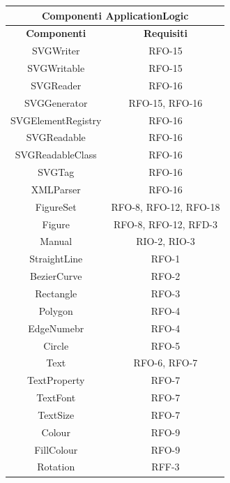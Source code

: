 \begin{table}[h]
\begin{center}
     \begin{tabular}
           {@{\extracolsep{\fill}}|c|c|}
      		\hline
           \multicolumn{2}{|c|}{ \textbf{Componenti ApplicationLogic} } \\
     \hline
      \textbf{Componenti} & \textbf{Requisiti} \\
      \hline
     SVGWriter & RFO-15 \\
     \hline
     SVGWritable & RFO-15\\
     \hline
     SVGReader & RFO-16\\
     \hline
     SVGGenerator & RFO-15, RFO-16\\
     \hline
     SVGElementRegistry & RFO-16\\
     \hline
     SVGReadable & RFO-16\\
     \hline
     SVGReadableClass & RFO-16\\
     \hline
     SVGTag & RFO-16\\
     \hline
     XMLParser & RFO-16\\
     \hline
     FigureSet & RFO-8, RFO-12, RFO-18 \\
     \hline
     Figure & RFO-8, RFO-12, RFD-3 \\
     \hline
     Manual & RIO-2, RIO-3 \\
     \hline
     StraightLine & RFO-1 \\
     \hline
     BezierCurve & RFO-2 \\
     \hline
     Rectangle & RFO-3 \\
     \hline
     Polygon & RFO-4 \\ 
     \hline
     EdgeNumebr & RFO-4 \\
     \hline
     Circle & RFO-5 \\
     \hline
     Text & RFO-6, RFO-7 \\
     \hline
     TextProperty & RFO-7 \\
     \hline
     TextFont & RFO-7 \\
     \hline
     TextSize & RFO-7\\
     \hline
     Colour & RFO-9 \\
     \hline
     FillColour & RFO-9 \\
     \hline
     Rotation & RFF-3 \\

\end{tabular}
\end{center}
\end{table}
